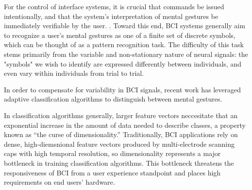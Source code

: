For the control of interface systems, it is crucial that commands be issued intentionally, and that the system's interpretation of mental gestures be immediately verifiable by the user. \cite{millan_combining_2010,ali_empirical_2014}. Toward this end, BCI systems generally aim to recognize a user's mental gestures as one of a finite set of discrete symbols, which can be thought of as a pattern recognition task. \cite{lotte_review_2007} The difficulty of this task stems primarily from the variable and non-stationary nature of neural signals: the "symbols" we wish to identify are expressed differently between individuals, and even vary within individuals from trial to trial. \cite{vidaurre_fully_2006,vidaurre_machine-learning-based_2011} 

In order to compensate for variability in BCI signals, recent work has leveraged adaptive classification algorithms to distinguish between mental gestures. 


In classification algorithms generally, larger feature vectors neccesitate that an exponential increase in the amount of data needed to describe classes, a property known as ``the curse of dimensionality.'' \cite{jain_statistical_2000,raudys_small_1991} Traditionally, BCI applications rely on dense, high-diemsnional feature vectors produced by multi-electrode scanning caps with high temporal resolution, so dimensionality represents a major bottleneck in training classification algorithms. This bottleneck threatens the responsiveness of BCI from a user experience standpoint and places high requirements on end users' hardware.


